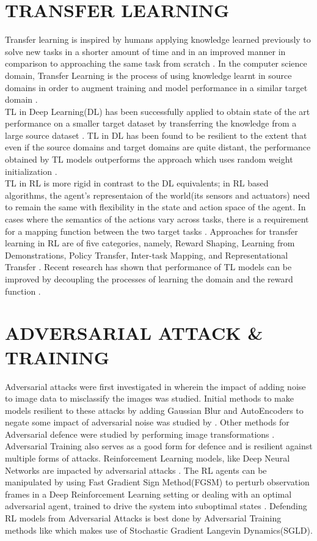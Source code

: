 \section{TRANSFER LEARNING} \label{lit-tl}
Transfer learning is inspired by humans applying knowledge learned previously to solve new tasks in a shorter amount of time and in an improved manner in comparison to approaching the same task from scratch \cite{TLInsp}. In the computer science domain, Transfer Learning is the process of using knowledge learnt in source domains in order to augment training and model performance in a similar target domain \cite{transfer-rl}. \\TL in Deep Learning(DL) has been successfully applied to obtain state of the art performance on a smaller target dataset by transferring the knowledge from a large source dataset \cite{TLDLBasic}. TL in DL has been found to be resilient to the extent that even if the source domains and target domains are quite distant, the performance obtained by TL models outperforms the approach which uses random weight initialization \cite{TLDLPower}. \\TL in RL is more rigid in contrast to the DL equivalents; in RL based algorithms, the agent's representaion of the world(its sensors and actuators)  need to remain the same with flexibility in the state and action space of the agent. In cases where the semantics of the actions vary across tasks, there is a requirement for a mapping function between the two target tasks \cite{TLRLImplement}. Approaches for transfer learning in RL are of five categories, namely, Reward Shaping, Learning from Demonstrations, Policy Transfer, Inter-task Mapping, and Representational Transfer \cite{tl-rl-survey}. Recent research has shown that performance of TL models can be improved by decoupling the processes of learning the domain and the reward function \cite{tl-decoupling}. 
\section{ADVERSARIAL ATTACK \& TRAINING} \label{lit-at}
Adversarial attacks were first investigated in \cite{ad-intro} wherein the impact of adding noise to image data to misclassify the images was studied. Initial methods to make models resilient to these attacks by adding Gaussian Blur and AutoEncoders to negate some impact of adversarial noise was studied by \cite{adreco1}. Other methods for Adversarial defence were studied by performing image transformations \cite{adreco2}.\\ Adversarial Training \cite{AT-Ian} also serves as a good form for defence and is resilient against multiple forms of attacks. Reinforcement Learning models, like Deep Neural Networks are impacted by adversarial attacks \cite{rlad1}. The RL agents can be manipulated by using Fast Gradient Sign Method(FGSM) \cite{rl-fgsm} to perturb observation frames in a Deep Reinforcement Learning setting or dealing with an optimal adversarial agent, trained to drive the system into suboptimal states \cite{rlad2}. Defending RL models from Adversarial Attacks is best done by Adversarial Training methods like \cite{rlat1} which makes use of Stochastic Gradient Langevin Dynamics(SGLD).
